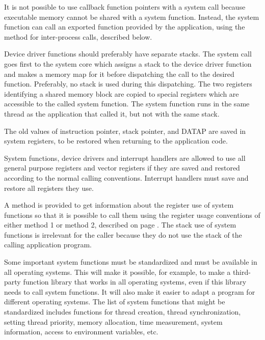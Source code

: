 \documentclass[forwardcom.tex]{subfiles}
\begin{document}
It is not possible to use callback function pointers with a system call because executable memory cannot be shared with a system function. Instead, the system function can call an exported function provided by the application, using the method for inter-process calls, described below.
\vspace{2mm}

Device driver functions should preferably have separate stacks. The system call goes first to the system core which assigns a stack to the device driver function and makes a memory map for it before dispatching the call to the desired function. Preferably, no stack is used during this dispatching. The two registers identifying a shared memory block are copied to special registers which are accessible to the called system function. The system function runs in the same thread as the application that called it, but not with the same stack. 
\vspace{2mm}

The old values of instruction pointer, stack pointer, and DATAP are saved in system registers, to be restored when returning to the application code. 
\vspace{2mm}

System functions, device drivers and interrupt handlers are allowed to use all general purpose registers and vector registers if they are saved and restored according to the normal calling conventions. Interrupt handlers must save and restore all registers they use. 
\vspace{2mm}

A method is provided to get information about the register use of system functions so that it is possible to call them using the register usage conventions of either method 1 or method 2, described on page \pageref{registerUsageConvention}. The stack use of system functions is irrelevant for the caller because they do not use the stack of the calling application program. 
\vspace{2mm}

Some important system functions must be standardized and must be available in all operating systems. This will make it possible, for example, to make a third-party function library that works in all operating systems, even if this library needs to call system functions. It will also make it easier to adapt a program for different operating systems. The list of system functions that might be standardized includes functions for thread creation, thread synchronization, setting thread priority, memory allocation, time measurement, system information, access to environment variables, etc. 
\vspace{2mm}
\end{document}
